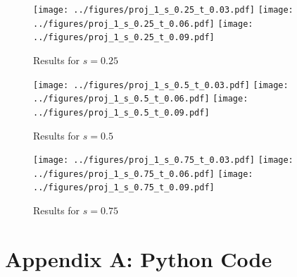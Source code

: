 \documentclass[twocolumn,10pt]{asme2ej}
\begin{document}
\begin{figure}[htb]
\begin{center}
\texttt{[image: ../figures/proj\_1\_s\_0.25\_t\_0.03.pdf]}
\texttt{[image: ../figures/proj\_1\_s\_0.25\_t\_0.06.pdf]}
\texttt{[image: ../figures/proj\_1\_s\_0.25\_t\_0.09.pdf]}
\caption{Results for $s = 0.25$}
\end{center}
\end{figure}

\begin{figure}[htb]
\begin{center}
\texttt{[image: ../figures/proj\_1\_s\_0.5\_t\_0.03.pdf]}
\texttt{[image: ../figures/proj\_1\_s\_0.5\_t\_0.06.pdf]}
\texttt{[image: ../figures/proj\_1\_s\_0.5\_t\_0.09.pdf]}
\caption{Results for $s = 0.5$}
\end{center}
\end{figure}

\begin{figure}[htb]
\begin{center}
\texttt{[image: ../figures/proj\_1\_s\_0.75\_t\_0.03.pdf]}
\texttt{[image: ../figures/proj\_1\_s\_0.75\_t\_0.06.pdf]}
\texttt{[image: ../figures/proj\_1\_s\_0.75\_t\_0.09.pdf]}
\caption{Results for $s = 0.75$}
\end{center}
\end{figure}

\clearpage
\onecolumn
\appendix       %
\section*{Appendix A: Python Code}
\end{document}
